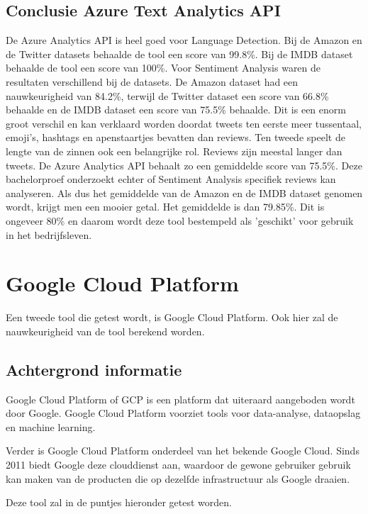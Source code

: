 \subsection{Conclusie Azure Text Analytics API}
\label{conclusieAzure}
De Azure Analytics API is heel goed voor Language Detection. Bij de Amazon en de Twitter datasets behaalde de tool een score van 99.8\%. Bij de IMDB dataset behaalde de tool een score van 100\%. Voor Sentiment Analysis waren de resultaten verschillend bij de datasets. De Amazon dataset had een nauwkeurigheid van 84.2\%, terwijl de Twitter dataset een score van 66.8\% behaalde en de IMDB dataset een score van 75.5\% behaalde. Dit is een enorm groot verschil en kan verklaard worden doordat tweets ten eerste meer tussentaal, emoji's, hashtags en apenstaartjes bevatten dan reviews. Ten tweede speelt de lengte van de zinnen ook een belangrijke rol. Reviews zijn meestal langer dan tweets. De Azure Analytics API behaalt zo een gemiddelde score van 75.5\%. Deze bachelorproef onderzoekt echter of Sentiment Analysis specifiek reviews kan analyseren. Als dus het gemiddelde van de Amazon en de IMDB dataset genomen wordt, krijgt men een mooier getal. Het gemiddelde is dan 79.85\%. Dit is ongeveer 80\% en daarom wordt deze tool bestempeld als 'geschikt' voor gebruik in het bedrijfsleven. 

\section{Google Cloud Platform}

Een tweede tool die getest wordt, is Google Cloud Platform. Ook hier zal de nauwkeurigheid van de tool berekend worden.

\subsection{Achtergrond informatie}
\label{achtergrondinformatiegooglecloudplatform}
Google Cloud Platform of GCP is een platform dat uiteraard aangeboden wordt door Google. Google Cloud Platform voorziet tools voor data-analyse, dataopslag en machine learning. \autocite{Bigelow2017}

Verder is Google Cloud Platform onderdeel van het bekende Google Cloud. Sinds 2011 biedt Google deze clouddienst aan, waardoor de gewone gebruiker gebruik kan maken van de producten die op dezelfde infrastructuur als Google draaien. \autocite{Bigelow2017}

Deze tool zal in de puntjes hieronder getest worden. 

